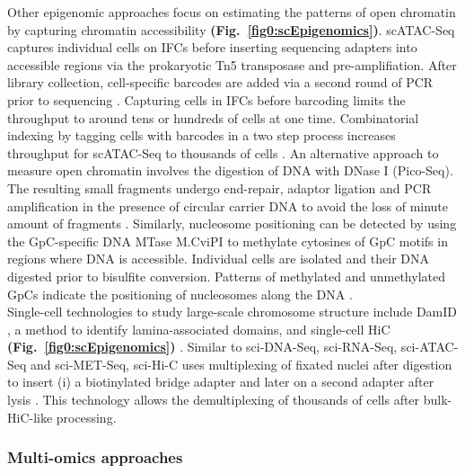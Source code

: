Other epigenomic approaches focus on estimating the patterns of open chromatin by capturing chromatin accessibility \textbf{(Fig.~\ref{fig0:scEpigenomics})}. \Gls{scATAC-Seq} captures individual cells on \glspl{IFC} before inserting sequencing adapters into accessible regions via the prokaryotic Tn5 transposase and pre-amplifiation. After library collection, cell-specific barcodes are added via a second round of PCR prior to sequencing \citep{Buenrostro2015}.  Capturing cells in IFCs before barcoding limits the throughput to around tens or hundreds of cells at one time. Combinatorial indexing by tagging cells with barcodes in a two step process increases throughput for scATAC-Seq to thousands of cells \citep{Cusanovich2015}. An alternative approach to measure open chromatin involves the digestion of DNA with DNase I (Pico-Seq). The resulting small fragments undergo end-repair, adaptor ligation and PCR amplification in the presence of circular carrier DNA to avoid the loss of minute amount of fragments \citep{Jin2015}. Similarly, nucleosome positioning can be detected by using the GpC-specific DNA \gls{MTase} M.CviPI to methylate cytosines of GpC motifs in regions where DNA is accessible. Individual cells are isolated and their DNA digested prior to bisulfite conversion. Patterns of methylated and unmethylated GpCs indicate the positioning of nucleosomes along the DNA \citep{Small2014}.\\

Single-cell technologies to study large-scale chromosome structure include \gls{DamID} \citep{Kind2015}, a method to identify lamina-associated domains, and single-cell \gls{HiC} \textbf{(Fig.~\ref{fig0:scEpigenomics})} \citep{Nagano2013}. Similar to sci-DNA-Seq, sci-RNA-Seq, sci-ATAC-Seq and sci-MET-Seq, sci-Hi-C uses multiplexing of fixated nuclei after digestion to insert (i) a biotinylated bridge adapter and later on a second adapter after lysis \citep{Ramani2017}. This technology allows the demultiplexing of thousands of cells after bulk-HiC-like processing. 

\subsubsection{Multi-omics approaches}

